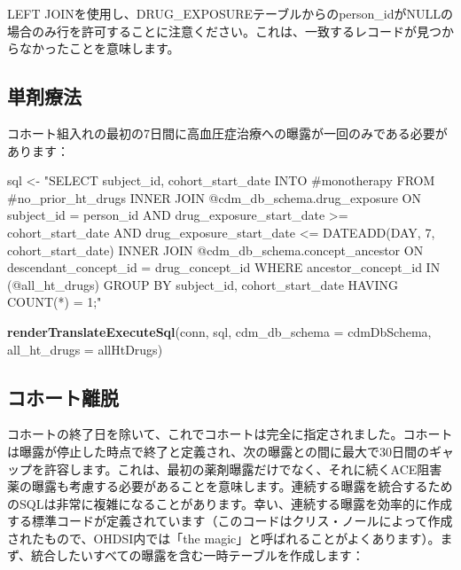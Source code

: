 \documentclass[
  11pt]{book}
\newenvironment{Shaded}{\begin{snugshade}}{\end{snugshade}}
\newcommand{\AttributeTok}[1]{\textcolor[rgb]{0.13,0.29,0.53}{#1}}
\newcommand{\FunctionTok}[1]{\textcolor[rgb]{0.13,0.29,0.53}{\textbf{#1}}}
\newcommand{\NormalTok}[1]{#1}
\newcommand{\OtherTok}[1]{\textcolor[rgb]{0.56,0.35,0.01}{#1}}
\newcommand{\StringTok}[1]{\textcolor[rgb]{0.31,0.60,0.02}{#1}}
\theoremstyle{definition}
\theoremstyle{definition}
\theoremstyle{definition}
\theoremstyle{definition}
\theoremstyle{remark}
\begin{document}
LEFT JOINを使用し、DRUG\_EXPOSUREテーブルからのperson\_idがNULLの場合のみ行を許可することに注意ください。これは、一致するレコードが見つからなかったことを意味します。

\subsection{単剤療法}\label{ux5358ux5264ux7642ux6cd5}

コホート組入れの最初の7日間に高血圧症治療への曝露が一回のみである必要があります：

\begin{Shaded}
\begin{Highlighting}[]
\NormalTok{sql }\OtherTok{\textless{}{-}} \StringTok{"SELECT subject\_id,}
\StringTok{  cohort\_start\_date}
\StringTok{INTO \#monotherapy}
\StringTok{FROM \#no\_prior\_ht\_drugs}
\StringTok{INNER JOIN @cdm\_db\_schema.drug\_exposure}
\StringTok{  ON subject\_id = person\_id}
\StringTok{    AND drug\_exposure\_start\_date \textgreater{}= cohort\_start\_date}
\StringTok{    AND drug\_exposure\_start\_date \textless{}= DATEADD(DAY, 7, cohort\_start\_date)}
\StringTok{INNER JOIN @cdm\_db\_schema.concept\_ancestor}
\StringTok{  ON descendant\_concept\_id = drug\_concept\_id}
\StringTok{WHERE ancestor\_concept\_id IN (@all\_ht\_drugs)}
\StringTok{GROUP BY subject\_id,}
\StringTok{  cohort\_start\_date}
\StringTok{HAVING COUNT(*) = 1;"}

\FunctionTok{renderTranslateExecuteSql}\NormalTok{(conn,}
\NormalTok{                          sql,}
                          \AttributeTok{cdm\_db\_schema =}\NormalTok{ cdmDbSchema,}
                          \AttributeTok{all\_ht\_drugs =}\NormalTok{ allHtDrugs)}
\end{Highlighting}
\end{Shaded}

\subsection{コホート離脱}\label{ux30b3ux30dbux30fcux30c8ux96e2ux8131}

コホートの終了日を除いて、これでコホートは完全に指定されました。コホートは曝露が停止した時点で終了と定義され、次の曝露との間に最大で30日間のギャップを許容します。これは、最初の薬剤曝露だけでなく、それに続くACE阻害薬の曝露も考慮する必要があることを意味します。連続する曝露を統合するためのSQLは非常に複雑になることがあります。幸い、連続する曝露を効率的に作成する標準コードが定義されています（このコードはクリス・ノールによって作成されたもので、OHDSI内では「the magic」と呼ばれることがよくあります）。まず、統合したいすべての曝露を含む一時テーブルを作成します：
\end{document}
